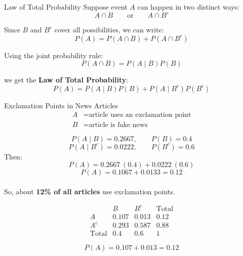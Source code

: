\documentclass[12pt]{beamer}
\begin{document}
\begin{frame}{}
\begin{block}{Law of Total Probability}
Suppose event \(A\) can happen in two distinct ways:
\[
A \cap B
\qquad \text{or} \qquad
A \cap B^c
\]

Since \(B\) and \(B^c\) cover all possibilities, we can write:
\[
P(A) = P(A \cap B) + P(A \cap B^c)
\]

Using the joint probability rule:
\[
P(A \cap B) = P(A \mid B)P(B)
\]

we get the \textbf{Law of Total Probability}:
\[
P(A)
=
P(A \mid B)P(B)
+
P(A \mid B^c)P(B^c)
\]
\end{block}
\end{frame}

\begin{frame}{}
\begin{block}{Exclamation Points in News Articles}
\[
\begin{aligned}
A &= \text{article uses an exclamation point}\\
B &= \text{article is fake news}
\end{aligned}
\]

\[
P(A \mid B)=0.2667,
\qquad
P(B)=0.4
\]
\[
P(A \mid B^c)=0.0222,
\qquad
P(B^c)=0.6
\]
Then:
\[
P(A)
=
0.2667~(0.4) + 0.0222~(0.6)
\]
\[
P(A)
=
0.1067 + 0.0133
=
0.12
\]\\
So, about \textbf{12\% of all articles} use exclamation points.
\end{block}
\end{frame}

\begin{frame}{}
\begin{block}{}
\[
\begin{array}{c|ccc}
& B & B^c & \text{Total} \\
\hline
A   & 0.107 & 0.013 & 0.12 \\
A^c & 0.293 & 0.587 & 0.88 \\
\hline
\text{Total} & 0.4 & 0.6 & 1
\end{array}
\]

\[
P(A) = 0.107 + 0.013 = \boxed{0.12}
\]

\end{block}
\end{frame}
\end{document}
